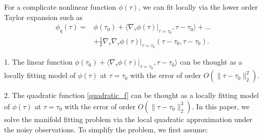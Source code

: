 \documentclass{article}
\newtheorem{assumption}[theorem]{Assumption}
\theoremstyle{remark}
\begin{document}
For a complicate nonlinear function $\phi(\tau)$, we can fit locally via the lower order Taylor expansion such as
\begin{equation}\label{quadratic_f}
\begin{aligned}
\phi_q(\tau) = &\phi(\tau_0) + \langle \nabla_\tau \phi(\tau)|_{\tau=\tau_0}, \tau-\tau_0 \rangle +...\\
&+ \frac{1}{2} \nabla_\tau \nabla_\tau \phi(\tau)|_{\tau=\tau_0} (\tau-\tau_0,\tau-\tau_0).
\end{aligned}
\end{equation}

1. The linear function
$
\phi(\tau_0) + \langle \nabla_\tau \phi(\tau)|_{\tau=\tau_0}, \tau-\tau_0 \rangle
$ 
can be thought as a locally fitting model of $\phi(\tau)$ at $\tau=\tau_0$ with the error of order $O(\|\tau-\tau_0 \|_2^2)$.

2. The quadratic function \eqref{quadratic_f} can be thought as a locally fitting model of $\phi(\tau)$ at $\tau=\tau_0$ with the error of order $O(\|\tau-\tau_0 \|_2^3)$.
In this paper, we solve the manifold fitting problem via the local quadratic approximation under the noisy observations. To simplify the problem, we first assume:
\end{document}
